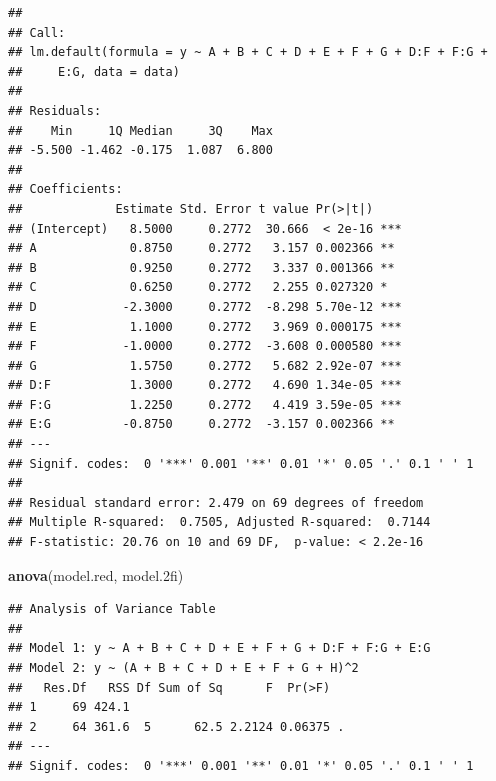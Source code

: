 \documentclass[]{article}
\newenvironment{Shaded}{\begin{snugshade}}{\end{snugshade}}
\newcommand{\FloatTok}[1]{\textcolor[rgb]{0.00,0.00,0.81}{#1}}
\newcommand{\KeywordTok}[1]{\textcolor[rgb]{0.13,0.29,0.53}{\textbf{#1}}}
\newcommand{\NormalTok}[1]{#1}
\begin{document}
\begin{verbatim}
## 
## Call:
## lm.default(formula = y ~ A + B + C + D + E + F + G + D:F + F:G + 
##     E:G, data = data)
## 
## Residuals:
##    Min     1Q Median     3Q    Max 
## -5.500 -1.462 -0.175  1.087  6.800 
## 
## Coefficients:
##             Estimate Std. Error t value Pr(>|t|)    
## (Intercept)   8.5000     0.2772  30.666  < 2e-16 ***
## A             0.8750     0.2772   3.157 0.002366 ** 
## B             0.9250     0.2772   3.337 0.001366 ** 
## C             0.6250     0.2772   2.255 0.027320 *  
## D            -2.3000     0.2772  -8.298 5.70e-12 ***
## E             1.1000     0.2772   3.969 0.000175 ***
## F            -1.0000     0.2772  -3.608 0.000580 ***
## G             1.5750     0.2772   5.682 2.92e-07 ***
## D:F           1.3000     0.2772   4.690 1.34e-05 ***
## F:G           1.2250     0.2772   4.419 3.59e-05 ***
## E:G          -0.8750     0.2772  -3.157 0.002366 ** 
## ---
## Signif. codes:  0 '***' 0.001 '**' 0.01 '*' 0.05 '.' 0.1 ' ' 1
## 
## Residual standard error: 2.479 on 69 degrees of freedom
## Multiple R-squared:  0.7505, Adjusted R-squared:  0.7144 
## F-statistic: 20.76 on 10 and 69 DF,  p-value: < 2.2e-16
\end{verbatim}

\begin{Shaded}
\begin{Highlighting}[]
\KeywordTok{anova}\NormalTok{(model.red, model}\FloatTok{.2}\NormalTok{fi)}
\end{Highlighting}
\end{Shaded}

\begin{verbatim}
## Analysis of Variance Table
## 
## Model 1: y ~ A + B + C + D + E + F + G + D:F + F:G + E:G
## Model 2: y ~ (A + B + C + D + E + F + G + H)^2
##   Res.Df   RSS Df Sum of Sq      F  Pr(>F)  
## 1     69 424.1                              
## 2     64 361.6  5      62.5 2.2124 0.06375 .
## ---
## Signif. codes:  0 '***' 0.001 '**' 0.01 '*' 0.05 '.' 0.1 ' ' 1
\end{verbatim}
\end{document}
